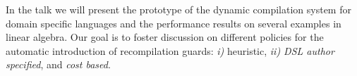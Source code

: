 \documentclass{llncs}
\begin{document}
In the talk we will present the prototype of the dynamic compilation system for domain specific languages
 and the performance results on several examples in linear algebra. Our goal is to foster
 discussion on different policies for the automatic introduction of recompilation guards:
 \emph{i)} heuristic, \emph{ii) DSL author specified}, and \emph{cost based}.



\end{document}
